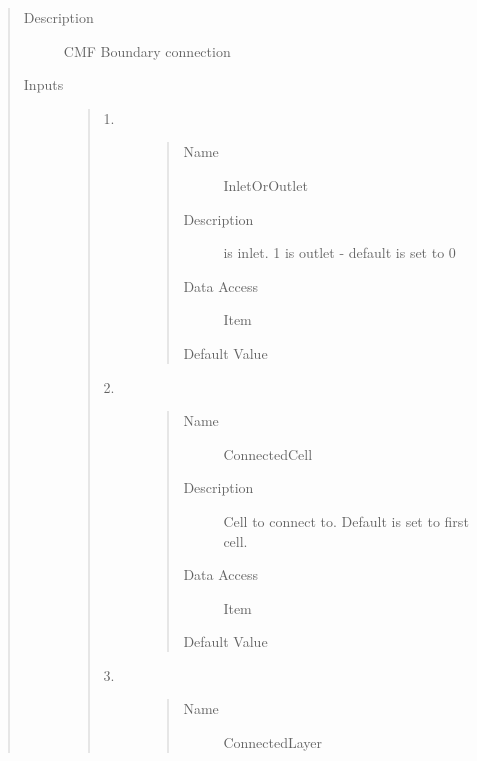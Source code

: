 \documentclass[letterpaper,10pt,english]{sphinxmanual}
\begin{document}
\begin{quote}\begin{description}
\item[{Description}] \leavevmode
CMF Boundary connection

\item[{Inputs}] \leavevmode\begin{quote}\begin{description}
\item[{1.}] \leavevmode\begin{quote}\begin{description}
\item[{Name}] \leavevmode
InletOrOutlet

\item[{Description}]  is inlet. 1 is outlet - default is set to 0

\item[{Data Access}] \leavevmode
Item

\item[{Default Value}] \leavevmode
{}

\end{description}\end{quote}

\item[{2.}] \leavevmode\begin{quote}\begin{description}
\item[{Name}] \leavevmode
ConnectedCell

\item[{Description}] \leavevmode
Cell to connect to. Default is set to first cell.

\item[{Data Access}] \leavevmode
Item

\item[{Default Value}] \leavevmode
{}

\end{description}\end{quote}

\item[{3.}] \leavevmode\begin{quote}\begin{description}
\item[{Name}] \leavevmode
ConnectedLayer


\end{description}
\end{quote}
\end{description}
\end{quote}
\end{description}
\end{quote}
\end{document}

